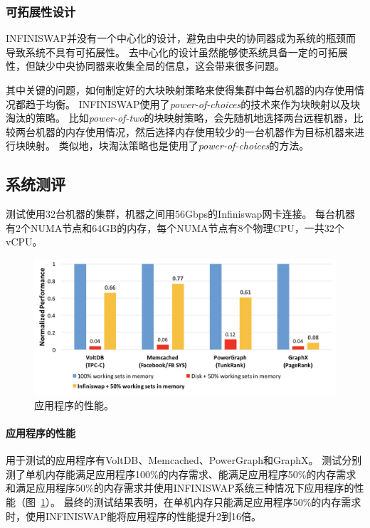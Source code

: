 \subsubsection{可拓展性设计}
INFINISWAP并没有一个中心化的设计，避免由中央的协同器成为系统的瓶颈而导致系统不具有可拓展性。
去中心化的设计虽然能够使系统具备一定的可拓展性，但缺少中央协同器来收集全局的信息，这会带来很多问题。

其中关键的问题，如何制定好的大块映射策略来使得集群中每台机器的内存使用情况都趋于均衡。
INFINISWAP使用了\emph{power-of-choices}的技术来作为块映射以及块淘汰的策略。
比如\emph{power-of-two}的块映射策略，会先随机地选择两台远程机器，比较两台机器的内存使用情况，然后选择内存使用较少的一台机器作为目标机器来进行块映射。
类似地，块淘汰策略也是使用了\emph{power-of-choices}的方法。

\subsection{系统测评}
测试使用32台机器的集群，机器之间用56Gbps的Infiniswap网卡连接。
每台机器有2个NUMA节点和64GB的内存，每个NUMA节点有8个物理CPU，一共32个vCPU。

\begin{figure}
\centering
\includegraphics[scale=0.4]{Figures/memory/infiniswap_evaluation1.png}
\decoRule
\caption{应用程序的性能\cite{gu2017efficient}。}
\label{fig:infiniswap_evaluation1}
\end{figure}

\paragraph{应用程序的性能}
用于测试的应用程序有VoltDB、Memcached、PowerGraph和GraphX。
测试分别测了单机内存能满足应用程序100\%的内存需求、能满足应用程序50\%的内存需求和满足应用程序50\%的内存需求并使用INFINISWAP系统三种情况下应用程序的性能（图~\ref{fig:infiniswap_evaluation1}）。
最终的测试结果表明，在单机内存只能满足应用程序50\%的内存需求时，使用INFINISWAP能将应用程序的性能提升2到16倍。

